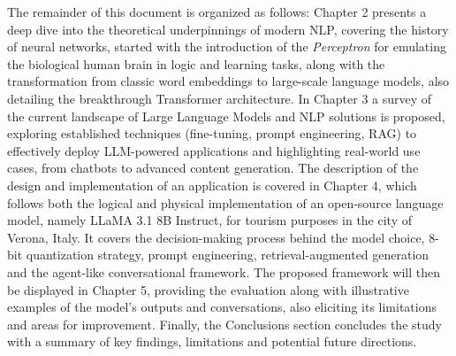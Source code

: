 The remainder of this document is organized as follows: Chapter 2 presents a deep dive into the theoretical underpinnings of modern NLP, covering the history of neural networks, started with the introduction of the \textit{Perceptron} \cite{rosenblatt1958perceptron} for emulating the biological human brain in logic and learning tasks, along with the transformation from classic word embeddings to large-scale language models, also detailing the breakthrough Transformer architecture.
In Chapter 3 a survey of the current landscape of Large Language Models and NLP solutions is proposed, exploring established techniques (fine-tuning, prompt engineering, RAG) to effectively deploy LLM-powered applications and highlighting real-world use cases, from chatbots to advanced content generation.
The description of the design and implementation of an application is covered in Chapter 4, which follows both the logical and physical implementation of an open-source language model, namely LLaMA 3.1 8B Instruct, for tourism purposes in the city of Verona, Italy. It covers the decision-making process behind the model choice, 8-bit quantization strategy, prompt engineering, retrieval-augmented generation and the agent-like conversational framework. The proposed framework will then be displayed in Chapter 5, providing the evaluation along with illustrative examples of the model’s outputs and conversations, also eliciting its limitations and areas for improvement.
Finally, the Conclusions section concludes the study with a summary of key findings, limitations and potential future directions.